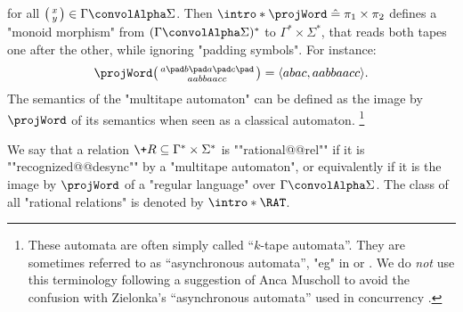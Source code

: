 for all $\pair{x}{y}\in \Gamma\convolAlpha\Sigma$.
Then \AP$\intro*\projWord \defeq \pi_1 \times \pi_2$ defines a "monoid morphism" 
from $(\Gamma\convolAlpha\Sigma)^*$ to $\Gamma^* \times \Sigma^*$,
that reads both tapes one after the other, while ignoring "padding symbols".
For instance:
\[
	\projWord\pair{a \pad b \pad a \pad c \pad}{a a b b a a c c}
	= \tup{abac, aabbaacc}.
\]
The semantics of the "multitape automaton"
can be defined as the image by $\projWord$ of its semantics when seen as a
classical automaton.%
\footnote[][-5em]{These automata are often simply called ``$k$-tape automata''. 
They are sometimes referred to as ``asynchronous automata'',
"eg" in \cite[\S~3]{CarayolLoding2011Uniformization} or
\cite[\S~3.1.2.2, p.~88]{Pelecq1997Isomorphismes}.
We do \emph{not} use this terminology following a suggestion
of Anca Muscholl to avoid the confusion with Zielonka's ``asynchronous automata'' used in 
concurrency \cite[\S~4]{Zielonka1987AsynchronousAutomata}.}

We say that a relation $\+R \subseteq \Gamma^* \times \Sigma^*$ is ""rational@@rel""
if it is \AP""recognized@@desync"" by a "multitape automaton",
or equivalently if it is the image by $\projWord$ of a "regular language"
over $\Gamma\convolAlpha\Sigma$.
The class of all "rational relations" is denoted by \AP$\intro*\RAT$.

